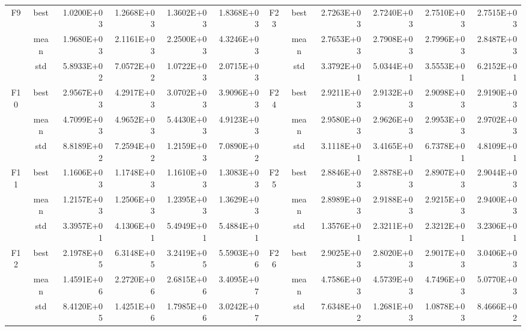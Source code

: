 \documentclass{wzuthesis}
\begin{document}
\begin{table}[htbp]
\begin{tabular}{rrrrrrccrrrr}
    \multicolumn{1}{c}{\multirow{3}[0]{*}{F9}} & \multicolumn{1}{c}{best} & 1.0200E+03 & 1.2668E+03 & 1.3602E+03 & 1.8368E+03 & \multirow{3}[0]{*}{F23} & best  & 2.7263E+03 & 2.7240E+03 & 2.7510E+03 & 2.7515E+03 \\
          & \multicolumn{1}{c}{mean} & 1.9680E+03 & 2.1161E+03 & 2.2500E+03 & 4.3246E+03 &       & mean  & 2.7653E+03 & 2.7908E+03 & 2.7996E+03 & 2.8487E+03 \\
          & \multicolumn{1}{c}{std} & 5.8933E+02 & 7.0572E+02 & 1.0722E+03 & 2.0715E+03 &       & std   & 3.3792E+01 & 5.0344E+01 & 3.5553E+01 & 6.2152E+01 \\
    \multicolumn{1}{c}{\multirow{3}[0]{*}{F10}} & \multicolumn{1}{c}{best} & 2.9567E+03 & 4.2917E+03 & 3.0702E+03 & 3.9096E+03 & \multirow{3}[0]{*}{F24} & best  & 2.9211E+03 & 2.9132E+03 & 2.9098E+03 & 2.9190E+03 \\
          & \multicolumn{1}{c}{mean} & 4.7099E+03 & 4.9652E+03 & 5.4430E+03 & 4.9123E+03 &       & mean  & 2.9580E+03 & 2.9626E+03 & 2.9953E+03 & 2.9702E+03 \\
          & \multicolumn{1}{c}{std} & 8.8189E+02 & 7.2594E+02 & 1.2159E+03 & 7.0890E+02 &       & std   & 3.1118E+01 & 3.4165E+01 & 6.7378E+01 & 4.8109E+01 \\
    \multicolumn{1}{c}{\multirow{3}[0]{*}{F11}} & \multicolumn{1}{c}{best} & 1.1606E+03 & 1.1748E+03 & 1.1610E+03 & 1.3083E+03 & \multirow{3}[0]{*}{F25} & best  & 2.8846E+03 & 2.8878E+03 & 2.8907E+03 & 2.9044E+03 \\
          & \multicolumn{1}{c}{mean} & 1.2157E+03 & 1.2506E+03 & 1.2395E+03 & 1.3629E+03 &       & mean  & 2.8989E+03 & 2.9188E+03 & 2.9215E+03 & 2.9400E+03 \\
          & \multicolumn{1}{c}{std} & 3.3957E+01 & 4.1306E+01 & 5.4949E+01 & 5.4884E+01 &       & std   & 1.3576E+01 & 2.3211E+01 & 2.3212E+01 & 3.2306E+01 \\
    \multicolumn{1}{c}{\multirow{3}[0]{*}{F12}} & \multicolumn{1}{c}{best} & 2.1978E+05 & 6.3148E+05 & 3.2419E+05 & 5.5903E+06 & \multirow{3}[0]{*}{F26} & best  & 2.9025E+03 & 2.8020E+03 & 2.9017E+03 & 3.0406E+03 \\
          & \multicolumn{1}{c}{mean} & 1.4591E+06 & 2.2720E+06 & 2.6815E+06 & 3.4095E+07 &       & mean  & 4.7586E+03 & 4.5739E+03 & 4.7496E+03 & 5.0770E+03 \\
          & \multicolumn{1}{c}{std} & 8.4120E+05 & 1.4251E+06 & 1.7985E+06 & 3.0242E+07 &       & std   & 7.6348E+02 & 1.2681E+03 & 1.0878E+03 & 8.4666E+02 \\

\end{tabular}
\end{table}
\end{document}
